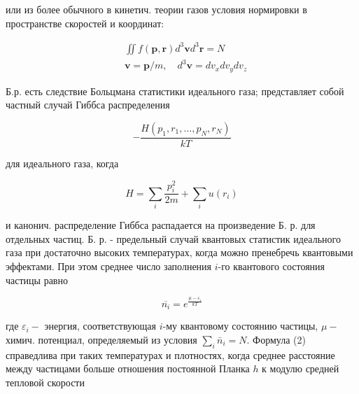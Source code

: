\documentclass[10pt]{article}
\begin{document}
или из более обычного в кинетич. теории газов условия нормировки в пространстве скоростей и координат:



\[

\begin{aligned}

& \iint f(\boldsymbol{p}, \boldsymbol{r}) d^{3} \boldsymbol{v} d^{3} \boldsymbol{r}=N \\

& \boldsymbol{v}=\boldsymbol{p} / m, \quad d^{3} \boldsymbol{v}=d v_{x} d v_{y} d v_{z}

\end{aligned}

\]



Б.р. есть следствие Больцмана статистики идеального газа; представляет собой частный случай Гиббса распределения



\[

-\frac{H\left(p_{1}, r_{1}, \ldots, p_{N}, r_{N}\right)}{k T}

\]



для идеального газа, когда



\[

H=\sum_{i} \frac{p_{i}^{2}}{2 m}+\sum_{i} u\left(r_{i}\right)

\]



и канонич. распределение Гиббса распадается на произведение Б. р. для отдельных частиц. Б. р. - предельный случай квантовых статистик идеального газа при достаточно высоких температурах, когда можно пренебречь квантовыми эффектами. При этом среднее число заполнения $i$-го квантового состояния частицы равно



\[

\overline{n_{i}}=e^{\frac{\mu-\varepsilon_{i}}{k T}}

\]



где $\varepsilon_{i}-$ энергия, соответствующая $i$-му квантовому состоянию частицы, $\mu-$ химич. потенциал, определяемый из условия $\sum_{i} \bar{n}_{i}=N$. Формула (2) справедлива при таких температурах и плотностях, когда среднее расстояние между частицами больше отношения постоянной Планка $h$ к модулю средней тепловой скорости
\end{document}
